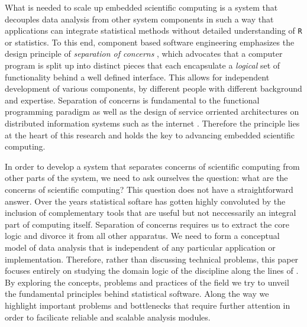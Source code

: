 \documentclass{article}
\newcommand{\R}{\texttt{R}\xspace}
\begin{document}
What is needed to scale up embedded scientific computing is a system that decouples data analysis from other system components in such a way that applications can integrate statistical methods without detailed understanding of \R or statistics. To this end, component based software engineering emphasizes the design principle of \emph{separation of concerns} \citep{heineman2001component}, which advocates that a computer program is split up into distinct pieces that each encapsulate a \emph{logical} set of functionality behind a well defined interface. This allows for independent development of various components, by different people with different background and expertise. Separation of concerns is fundamental to the functional programming paradigm \citep{reade1989elements} as well as the design of service orriented architectures on distributed information systems such as the internet \citep{fielding2000architectural}. Therefore the principle lies at the heart of this research and holds the key to advancing embedded scientific computing.

In order to develop a system that separates concerns of scientific computing from other parts of the system, we need to ask ourselves the question: what are the concerns of scientific computing? This question does not have a straightforward answer. Over the years statistical softare has gotten highly convoluted by the inclusion of complementary tools that are useful but not neccessarily an integral part of computing itself. Separation of concerns requires us to extract the core logic and divorce it from all other apparatus. We need to form a conceptual model of data analysis that is independent of any particular application or implementation. Therefore, rather than discussing technical problems, this paper focuses entirely on studying the domain logic of the discipline along the lines of \cite{evans2004domain}. By exploring the concepts, problems and practices of the field we try to unveil the fundamental principles behind statistical software. Along the way we highlight important problems and bottlenecks that require further attention in order to facilicate reliable and scalable analysis modules.
\end{document}
